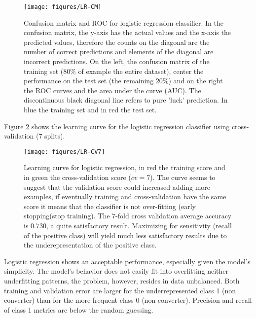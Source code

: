 \documentclass[11pt]{article}
\theoremstyle{definition}
\theoremstyle{remark}
\begin{document}
\begin{figure}[H]
        \centering
        \texttt{[image: figures/LR-CM]}
        \caption{Confusion matrix and ROC for logistic regression classifier. In the confusion matrix, the y-axis has the actual values and the x-axis the predicted values, therefore the counts on the diagonal are the number of correct predictions and elements of the diagonal are incorrect predictions.
        On the left, the confusion matrix of the training set ($80\%$ of example the entire dataset), center the performance on the test set (the remaining $20\%$) and on the right the ROC curves and the area under the curve (AUC). The discontinuous black diagonal line refers to pure 'luck' prediction. In blue the training set and in red the test set.}
\label{fig:lr-cm}
\end{figure}

Figure \ref{fig:lr-cv7} shows the learning curve for the logistic regression classifier using cross-validation (7 splits).
\begin{figure}[H]
        \centering
        \texttt{[image: figures/LR-CV7]}
        \caption{Learning curve for logistic regression, in red the training score and in green the cross-validation score ($cv=7$). The curve seems to suggest that the validation score could increased adding more examples, if eventually training and cross-validation have the same score it means that the classifier is not over-fitting (early stopping(stop training). 
		The 7-fold cross validation average accuracy is $0.730$, a quite satisfactory result. Maximizing for sensitivity (recall of the positive class) will yield much less satisfactory results due to the underepresentation of the positive class.   
        } \label{fig:lr-cv7}
\end{figure}

Logistic regression shows an acceptable performance, especially given the model's simplicity. 
The model's behavior does not easily fit into overfitting neither underfitting patterns, the problem, however, resides in data unbalanced. Both training and validation error are larger for the underrepresented class 1 (non converter) than for the more frequent class 0 (non converter). Precision and recall of class 1 metrics are below the random guessing. 

\end{document}
